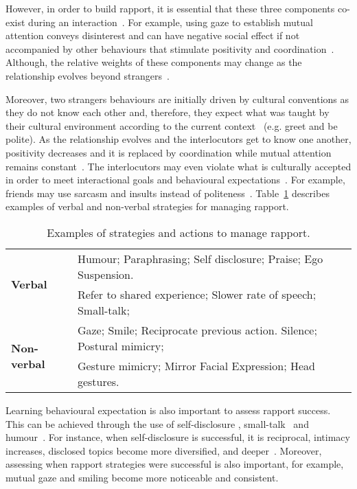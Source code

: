 However, in order to build rapport, it is essential that these three components co-exist during an interaction~\cite{Grahe1999, Wang2010, Zhao2014, Cassell2007}. For example, using gaze to establish mutual attention conveys disinterest and can have negative social effect if not accompanied by other behaviours that stimulate positivity and coordination~\cite{Wang2010}. Although, the relative weights of these components may change as the relationship evolves beyond strangers~\cite{Wang2010, Zhao2014, Cassell2007}.

Moreover, two strangers behaviours are initially driven by cultural conventions as they do not know each other and, therefore, they expect what was taught by their cultural environment according to the current context~\cite{Zhao2014} (e.g. greet and be polite). As the relationship evolves and the interlocutors get to know one another, positivity decreases and it is replaced by coordination while mutual attention remains constant~\cite{Zhao2014, Tickle-Degnen1990}. The interlocutors may even violate what is culturally accepted in order to meet interactional goals and behavioural expectations~\cite{Zhao2014}. For example, friends may use sarcasm and insults instead of politeness~\cite{Zhao2014}. Table~\ref{table:rapportStrategies} describes examples of verbal and non-verbal strategies for managing rapport.

\vspace{-3mm}
\begin{table}[]
	\centering
	\begin{tabular}{@{}ll@{}}
		\toprule
		\multirow{2}{*}{\textbf{Verbal}}    & Humour; Paraphrasing; Self disclosure; Praise; Ego Suspension.\\ 
		& Refer to shared experience; Slower rate of speech; Small-talk; \\ \midrule
		\multirow{2}{*}{\textbf{Non-verbal}} & Gaze; Smile; Reciprocate previous action. Silence; Postural mimicry; \\  
		& Gesture mimicry; Mirror Facial Expression; Head gestures. \\ \bottomrule
	\end{tabular}
	\caption{Examples of strategies and actions to manage rapport.}
	\label{table:rapportStrategies}
\end{table}
\vspace{-8mm}

Learning behavioural expectation is also important to assess rapport success. This can be achieved through the use of self-disclosure \cite{Moon2000}, small-talk~\cite{Cassell2003} and humour~\cite{Treger2013}. For instance, when self-disclosure is successful, it is reciprocal, intimacy increases, disclosed topics become more diversified, and deeper~\cite{Zhao2014}. Moreover, assessing when rapport strategies were successful is also important, for example, mutual gaze and smiling become more noticeable and consistent\cite{Grahe1999, Zhao2014}.

